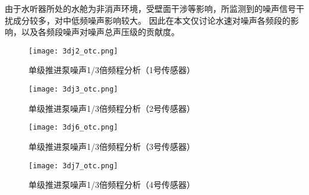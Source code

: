 由于水听器所处的水舱为非消声环境，受壁面干涉等影响，所监测到的噪声信号干扰成分较多，对中低频噪声影响较大。
因此在本文仅讨论水速对噪声各频段的影响，以及各频段噪声对噪声总声压级的贡献度。
\begin{figure}[htbp]
    \centering
    \texttt{[image: 3dj2\_otc.png]}
    \caption{\label{fig:djotc1}单级推进泵噪声1/3倍频程分析（1号传感器）}
\end{figure}
\begin{figure}[htbp]
    \centering
    \texttt{[image: 3dj3\_otc.png]}
    \caption{\label{fig:djotc2}单级推进泵噪声1/3倍频程分析（2号传感器）}
\end{figure}
\begin{figure}[htbp]
    \centering
    \texttt{[image: 3dj6\_otc.png]}
    \caption{\label{fig:djotc3}单级推进泵噪声1/3倍频程分析（3号传感器）}
\end{figure}
\begin{figure}[htbp]
    \centering
    \texttt{[image: 3dj7\_otc.png]}
    \caption{\label{fig:djotc4}单级推进泵噪声1/3倍频程分析（4号传感器）}
\end{figure}

